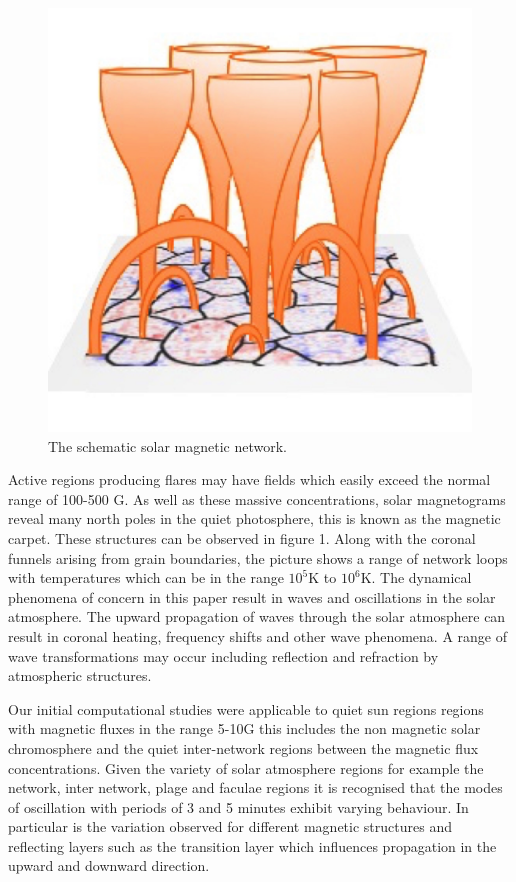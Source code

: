 \documentclass[linenumbers]{aastex63}
\begin{document}
\begin{figure}[h]\label{magneticnetwork}
\centering
\includegraphics[scale=1.0]{solar-network-v1.jpg}
\caption{The schematic solar magnetic network.}
\end{figure}

Active regions producing flares may have fields which easily exceed the normal range of 100-500 G. As well as these massive concentrations, solar magnetograms reveal many north poles in the quiet photosphere, this is known as the magnetic carpet. These structures can be observed in figure 1. Along with the coronal funnels arising from grain boundaries, the picture shows a range of network loops with temperatures which can be in the range $10^{5}$K to $10^{6}$K. The dynamical phenomena of concern in this paper result in waves and oscillations in the solar atmosphere. The upward propagation of waves through the solar atmosphere can result in coronal heating, frequency shifts and other wave phenomena. A range of wave transformations may occur including reflection and refraction by atmospheric structures. 


Our initial computational studies were applicable to quiet sun regions regions with magnetic fluxes in the range 5-10G this includes the non magnetic solar chromosphere and the quiet inter-network regions between the magnetic flux concentrations. Given the variety of solar atmosphere regions for example the network, inter network, plage and faculae regions it is recognised that the modes of oscillation with periods of 3 and 5 minutes exhibit varying behaviour. In particular is the variation observed for different magnetic structures and reflecting layers such as the transition layer which influences propagation in the upward and downward direction.
\end{document}

